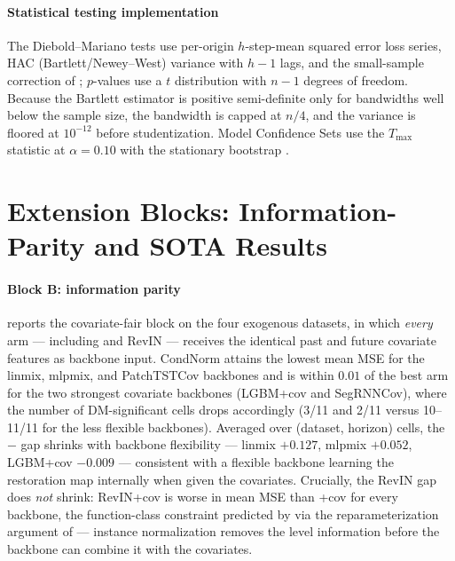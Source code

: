 \paragraph{Statistical testing implementation}
The Diebold--Mariano tests \citep{diebold1995comparing} use per-origin
$h$-step-mean squared error loss series, HAC (Bartlett/Newey--West) variance
with $h-1$ lags, and the small-sample correction of \citet{harvey1997testing};
$p$-values use a $t$ distribution with $n-1$ degrees of freedom. Because the
Bartlett estimator is positive semi-definite only for bandwidths well below
the sample size, the bandwidth is capped at $n/4$, and the variance is floored
at $10^{-12}$ before studentization. Model Confidence Sets
\citep{hansen2011mcs} use the $T_{\max}$ statistic at $\alpha = 0.10$ with the
stationary bootstrap \citep{politis1994stationary}.

\section{Extension Blocks: Information-Parity and SOTA Results}\label{app:ext}

\paragraph{Block B: information parity}
 reports the covariate-fair block on the four exogenous
datasets, in which \emph{every} arm --- including \rawm{} and RevIN --- receives
the identical past and future covariate features as backbone input.
CondNorm attains the lowest mean MSE for the linmix, mlpmix, and PatchTSTCov
backbones and is within $0.01$ of the best arm for the two strongest
covariate backbones (LGBM+cov and SegRNNCov), where the number of
DM-significant cells drops accordingly (3/11 and 2/11 versus 10--11/11 for the
less flexible backbones). Averaged over (dataset, horizon) cells, the
\rawm{}$-$\cnm{} gap shrinks with backbone flexibility --- linmix $+0.127$,
mlpmix $+0.052$, LGBM+cov $-0.009$ --- consistent with a flexible backbone
learning the restoration map internally when given the covariates. Crucially,
the RevIN gap does \emph{not} shrink: RevIN+cov is worse in mean MSE than \rawm{}+cov for
every backbone, the function-class constraint predicted by
 via the reparameterization argument of
\citet{toner2024linear} --- instance normalization removes the level
information before the backbone can combine it with the covariates.

